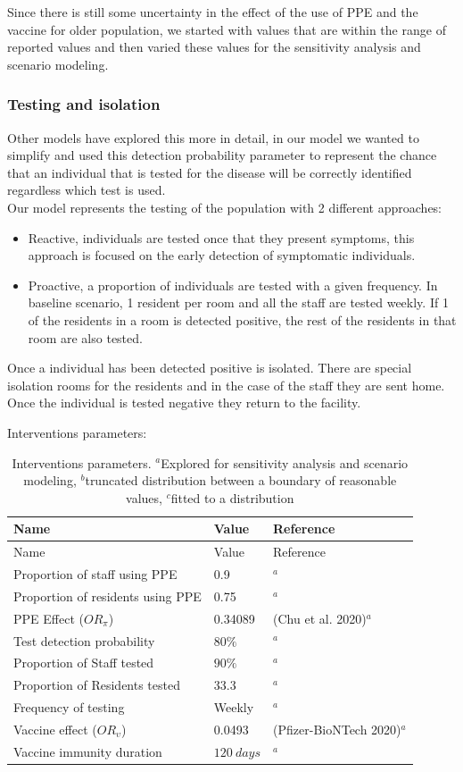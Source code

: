 \documentclass[
]{article}
\providecommand{\tightlist}{%
  \setlength{\itemsep}{0pt}\setlength{\parskip}{0pt}}
\begin{document}
Since there is still some uncertainty in the effect of the use of PPE
and the vaccine for older population, we started with values that are
within the range of reported values and then varied these values for the
sensitivity analysis and scenario modeling.

\hypertarget{testing-and-isolation}{%
\subsubsection{Testing and isolation}\label{testing-and-isolation}}

Other models have explored this more in detail, in our model we wanted
to simplify and used this detection probability parameter to represent
the chance that an individual that is tested for the disease will be
correctly identified regardless which test is used.\\
Our model represents the testing of the population with 2 different
approaches:

\begin{itemize}
\tightlist
\item
  Reactive, individuals are tested once that they present symptoms, this
  approach is focused on the early detection of symptomatic individuals.
\item
  Proactive, a proportion of individuals are tested with a given
  frequency. In baseline scenario, 1 resident per room and all the staff
  are tested weekly. If 1 of the residents in a room is detected
  positive, the rest of the residents in that room are also tested.
\end{itemize}

Once a individual has been detected positive is isolated. There are
special isolation rooms for the residents and in the case of the staff
they are sent home. Once the individual is tested negative they return
to the facility.

Interventions parameters:

\begin{longtable}[]{@{}lll@{}}
\caption{Interventions parameters. \(^a\)Explored for sensitivity
analysis and scenario modeling, \(^b\)truncated distribution between a
boundary of reasonable values, \(^c\)fitted to a
distribution}\tabularnewline
\toprule
Name & Value & Reference\tabularnewline
\midrule
\endfirsthead
\toprule
Name & Value & Reference\tabularnewline
\midrule
\endhead
Proportion of staff using PPE & 0.9 & \(^a\)\tabularnewline
Proportion of residents using PPE & 0.75 & \(^a\)\tabularnewline
PPE Effect (\(OR_\pi\)) & 0.34089 & (Chu et al.
2020)\(^a\)\tabularnewline
Test detection probability & \(80\%\) & \(^a\)\tabularnewline
Proportion of Staff tested & \(90\%\) & \(^a\)\tabularnewline
Proportion of Residents tested & \(33.3%
\) & \(^a\)\tabularnewline
Frequency of testing & Weekly & \(^a\)\tabularnewline
Vaccine effect (\(OR_\upsilon\)) & 0.0493 & (Pfizer-BioNTech
2020)\(^a\)\tabularnewline
Vaccine immunity duration & \(120\ days\) & \(^a\)\tabularnewline
\bottomrule
\end{longtable}
\end{document}
